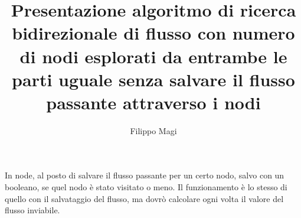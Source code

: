 \documentclass{article}
\title{Presentazione algoritmo di ricerca bidirezionale di flusso con numero di nodi esplorati da entrambe le parti uguale senza salvare il flusso passante attraverso i nodi}
\author{Filippo Magi }
\begin{document}
\maketitle

In node, al posto di salvare il flusso passante per un certo nodo, salvo con un booleano, se quel nodo è stato visitato o meno.
Il funzionamento è lo stesso di quello con il salvataggio del flusso, ma dovrò calcolare ogni volta il valore del flusso inviabile.
\end{document}
